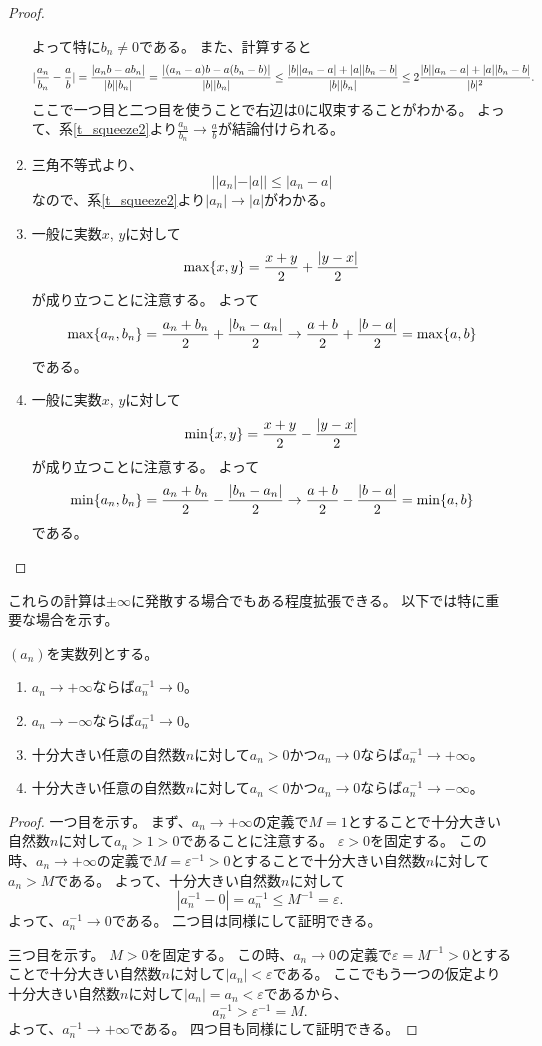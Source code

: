 \begin{proof}
\begin{enumerate}
$$$$
よって特に$b_n \ne 0$である。
また、計算すると
$$
\lvert\frac{a_n}{b_n}-\frac{a}{b}\rvert = \frac{|a_n b-a b_n|}{|b||b_n|} = \frac{|(a_n-a)b-a(b_n-b)|}{|b||b_n|} \le \frac{|b||a_n-a|+|a||b_n-b|}{|b||b_n|} \le 2\frac{|b||a_n-a|+|a||b_n-b|}{|b|^2}.
$$
ここで一つ目と二つ目を使うことで右辺は$0$に収束することがわかる。
よって、系\ref{t_squeeze2}より$\frac{a_n}{b_n} \to \frac{a}{b}$が結論付けられる。
\item
三角不等式より、
$$
||a_n|-|a|| \le |a_n-a|
$$
なので、系\ref{t_squeeze2}より$|a_n| \to |a|$がわかる。
\item
一般に実数$x$, $y$に対して
$$
\max\{ x, y \} = \frac{x+y}{2}+\frac{|y-x|}{2}
$$
が成り立つことに注意する。
よって
$$
\max\{ a_n, b_n \} = \frac{a_n+b_n}{2}+\frac{|b_n-a_n|}{2} \to \frac{a+b}{2}+\frac{|b-a|}{2} = \max\{ a, b \}
$$
である。
\item
一般に実数$x$, $y$に対して
$$
\min\{ x, y \} = \frac{x+y}{2}-\frac{|y-x|}{2}
$$
が成り立つことに注意する。
よって
$$
\min\{ a_n, b_n \} = \frac{a_n+b_n}{2}-\frac{|b_n-a_n|}{2} \to \frac{a+b}{2}-\frac{|b-a|}{2} = \min\{ a, b \}
$$
である。
\end{enumerate}
\end{proof}

これらの計算は$\pm \infty$に発散する場合でもある程度拡張できる。
以下では特に重要な場合を示す。

\begin{proposition}
$(a_n)$を実数列とする。
\begin{enumerate}
\item
$a_n \to +\infty$ならば$a_n^{-1} \to 0$。
\item
$a_n \to -\infty$ならば$a_n^{-1} \to 0$。
\item
十分大きい任意の自然数$n$に対して$a_n > 0$かつ$a_n \to 0$ならば$a_n^{-1} \to +\infty$。
\item
十分大きい任意の自然数$n$に対して$a_n < 0$かつ$a_n \to 0$ならば$a_n^{-1} \to -\infty$。
\end{enumerate}
\end{proposition}

\begin{proof}
一つ目を示す。
まず、$a_n \to +\infty$の定義で$M = 1$とすることで十分大きい自然数$n$に対して$a_n > 1 > 0$であることに注意する。
$\varepsilon > 0$を固定する。
この時、$a_n \to +\infty$の定義で$M = \varepsilon^{-1} > 0$とすることで十分大きい自然数$n$に対して$a_n > M$である。
よって、十分大きい自然数$n$に対して
$$
|a_n^{-1}-0| = a_n^{-1} \le M^{-1} = \varepsilon.
$$
よって、$a_n^{-1} \to 0$である。
二つ目は同様にして証明できる。

三つ目を示す。
$M > 0$を固定する。
この時、$a_n \to 0$の定義で$\varepsilon = M^{-1} > 0$とすることで十分大きい自然数$n$に対して$|a_n| < \varepsilon$である。
ここでもう一つの仮定より十分大きい自然数$n$に対して$|a_n| = a_n < \varepsilon$であるから、
$$
a_n^{-1} > \varepsilon^{-1} = M.
$$
よって、$a_n^{-1} \to +\infty$である。
四つ目も同様にして証明できる。
\end{proof}


